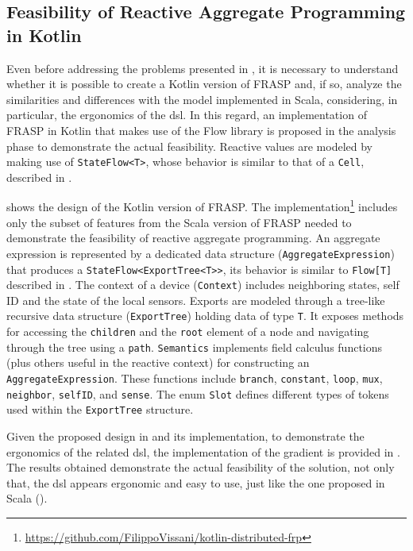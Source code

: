 \subsection{Feasibility of Reactive Aggregate Programming in Kotlin}
\label{subsection:Feasibility-Reactive-Aggregate-Programming}

Even before addressing the problems presented in , it is necessary to understand whether it is possible to create a Kotlin version of FRASP and, if so, analyze the similarities and differences with the model implemented in Scala, considering, in particular, the ergonomics of the \ac{dsl}. In this regard, an implementation of FRASP in Kotlin that makes use of the Flow library is proposed in the analysis phase to demonstrate the actual feasibility. Reactive values are modeled by making use of \texttt{StateFlow<T>}, whose behavior is similar to that of a \texttt{Cell}, described in .

 shows the design of the Kotlin version of FRASP. The implementation\footnote{\url{https://github.com/FilippoVissani/kotlin-distributed-frp}} includes only the subset of features from the Scala version of FRASP needed to demonstrate the feasibility of reactive aggregate programming. An aggregate expression is represented by a dedicated data structure (\texttt{AggregateExpression}) that produces a \texttt{StateFlow<ExportTree<T>>}, its behavior is similar to \texttt{Flow[T]} described in . The context of a device (\texttt{Context}) includes neighboring states, self ID and the state of the local sensors. Exports are modeled through a tree-like recursive data structure (\texttt{ExportTree}) holding data of type \texttt{T}. It exposes methods for accessing the \texttt{children} and the \texttt{root} element of a node and navigating through the tree using a \texttt{path}. \texttt{Semantics} implements field calculus functions (plus others useful in the reactive context) for constructing an \texttt{AggregateExpression}. These functions include \texttt{branch}, \texttt{constant}, \texttt{loop}, \texttt{mux}, \texttt{neighbor}, \texttt{selfID}, and \texttt{sense}. The enum \texttt{Slot} defines different types of tokens used within the \texttt{ExportTree} structure.

Given the proposed design in  and its implementation, to demonstrate the ergonomics of the related \ac{dsl}, the implementation of the gradient is provided in . The results obtained demonstrate the actual feasibility of the solution, not only that, the \ac{dsl} appears ergonomic and easy to use, just like the one proposed in Scala ().

